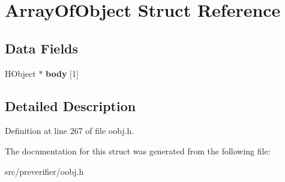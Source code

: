 \section{ArrayOfObject Struct Reference}
\label{struct_array_of_object}
\subsection*{Data Fields}
\begin{DoxyCompactItemize}
\item 
HObject $\ast$ {\bfseries body} [1]\label{struct_array_of_object_a858a259ea771df632d439b4ac6d596af}

\end{DoxyCompactItemize}


\subsection{Detailed Description}


Definition at line 267 of file oobj.h.



The documentation for this struct was generated from the following file:\begin{DoxyCompactItemize}
\item 
src/preverifier/oobj.h\end{DoxyCompactItemize}
